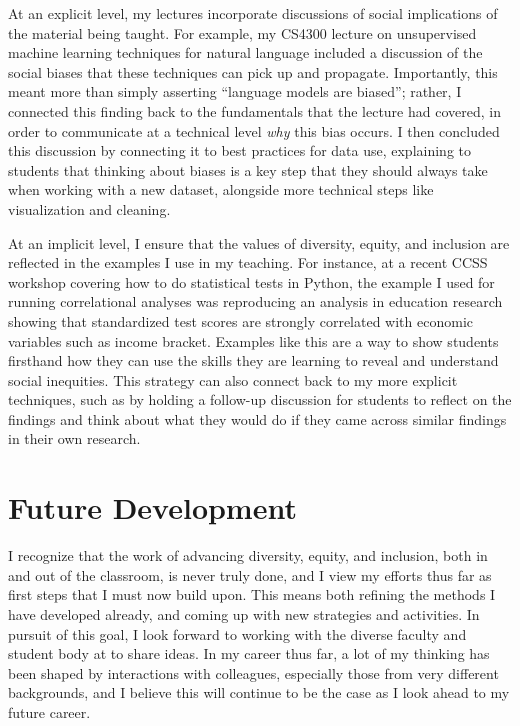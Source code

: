 \documentclass[12pt,letterpaper]{article}
\begin{document}
At an explicit level, my lectures incorporate discussions of social implications of the material being taught.
For example, my CS4300 lecture on unsupervised machine learning techniques for natural language included a discussion of the social biases that these techniques can pick up and propagate.
Importantly, this meant more than simply asserting ``language models are biased''; rather, I connected this finding back to the fundamentals that the lecture had covered, in order to communicate at a technical level \emph{why} this bias occurs.
I then concluded this discussion by connecting it to best practices for data use, explaining to students that thinking about biases is a key step that they should always take when working with a new dataset, alongside more technical steps like visualization and cleaning.

At an implicit level, I ensure that the values of diversity, equity, and inclusion are reflected in the examples I use in my teaching.
For instance, at a recent CCSS workshop covering how to do statistical tests in Python, the example I used for running correlational analyses was reproducing an analysis in education research showing that standardized test scores are strongly correlated with economic variables such as income bracket.
Examples like this are a way to show students firsthand how they can use the skills they are learning to reveal and understand social inequities.
This strategy can also connect back to my more explicit techniques, such as by holding a follow-up discussion for students to reflect on the findings and think about what they would do if they came across similar findings in their own research.

\section{Future Development}
I recognize that the work of advancing diversity, equity, and inclusion, both in and out of the classroom, is never truly done, and I view my efforts thus far as first steps that I must now build upon.
This means both refining the methods I have developed already, and coming up with new strategies and activities.
In pursuit of this goal, I look forward to working with the diverse faculty and student body at \schoolname to share ideas.
In my career thus far, a lot of my thinking has been shaped by interactions with colleagues, especially those from very different backgrounds, and I believe this will continue to be the case as I look ahead to my future career.
\end{document}
